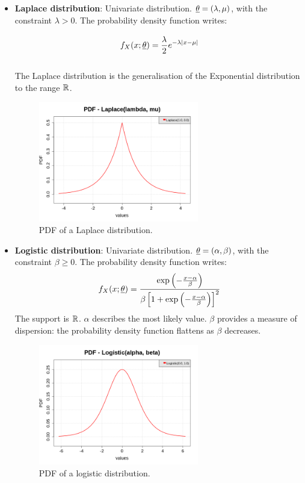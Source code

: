 {\begin{itemize}
\item {\bf Laplace distribution}: Univariate distribution. ${\underline{\theta}} = \left( \lambda, \mu \right)$, with the constraint $\lambda>0$. The probability density function writes:
\begin{equation}
f_X(x;{\underline{\theta}}) = \displaystyle \frac{\lambda^{\strut}}{2_{\strut}}e^{-\lambda |x-\mu|}
\end{equation}

The Laplace distribution is the generalisation of the Exponential distribution to the range ${\mathbb R}$.

\begin{figure}[H]
\begin{center}
\includegraphics[width=7cm]{Figures/pdf_Laplace.png}
\caption{PDF of a Laplace distribution.}
\end{center}
\end{figure}





\item {\bf Logistic distribution}: Univariate distribution. ${\underline{\theta}} = \left(\alpha,\beta \right)$, with the constraint $\beta \geq 0$. The probability density function writes:
\begin{equation}
f_X(x;{\underline{\theta}}) = \frac{\exp \left( -\frac{x-\alpha}{\beta} \right)}{\beta \left[ 1+\exp \left( -\frac{x-\alpha}{\beta} \right) \right]^2}
\end{equation}
The support is ${\mathbb R}$. $\alpha$ describes the most likely value. $\beta$ provides a measure of dispersion: the probability density function flattens as $\beta$ decreases.

\begin{figure}[H]
\begin{center}
\includegraphics[width=7cm]{Figures/pdf_Logistic.png}
\caption{PDF of a  logistic distribution.}
\end{center}
\end{figure}



\end{itemize}}

